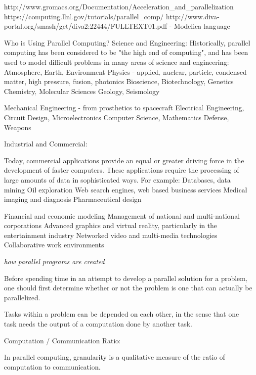 http://www.gromacs.org/Documentation/Acceleration_and_parallelization
https://computing.llnl.gov/tutorials/parallel_comp/
http://www.diva-portal.org/smash/get/diva2:22444/FULLTEXT01.pdf - Modelica language

Who is Using Parallel Computing?
  Science and Engineering:
    Historically, parallel computing has been considered to be "the high end of computing", and has been used to model difficult problems in many areas of science and engineering:
        Atmosphere, Earth, Environment
        Physics - applied, nuclear, particle, condensed matter, high pressure, fusion, photonics
        Bioscience, Biotechnology, Genetics
        Chemistry, Molecular Sciences
        Geology, Seismology

        Mechanical Engineering - from prosthetics to spacecraft
        Electrical Engineering, Circuit Design, Microelectronics
        Computer Science, Mathematics
        Defense, Weapons

    Industrial and Commercial:

       Today, commercial applications provide an equal or greater driving force in the development of faster computers. These applications require the processing of large amounts of data in sophisticated ways. For example:
       Databases, data mining
       Oil exploration
       Web search engines, web based business services
       Medical imaging and diagnosis
       Pharmaceutical design

       Financial and economic modeling
       Management of national and multi-national corporations
       Advanced graphics and virtual reality, particularly in the entertainment industry
       Networked video and multi-media technologies
       Collaborative work environments

\emph{how parallel programs are created}

    Before spending time in an attempt to develop a parallel solution for a problem, one should first determine whether or not the problem is one that can actually be parallelized.

      Tasks within a problem can be depended on each other, in the sense that one task needs the output of a computation done by another task.

      Computation / Communication Ratio:

          In parallel computing, granularity is a qualitative measure of the ratio of computation to communication.

